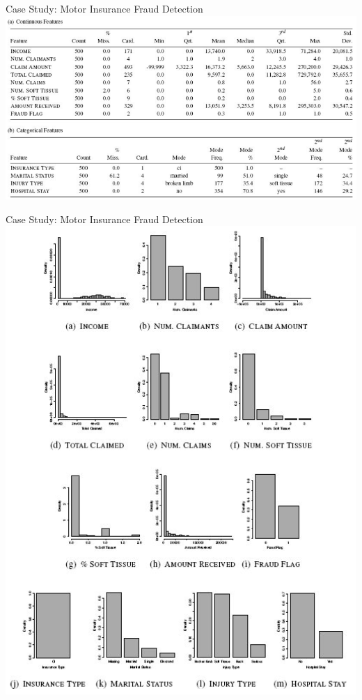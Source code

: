 \documentclass[aspectratio=169,xcolor=dvipsnames]{beamer}
\begin{document}
\begin{frame}{Case Study: Motor Insurance Fraud Detection}
\centering
\includegraphics[scale=0.32]{images/motor_rep.png}
\end{frame}
\begin{frame}{Case Study: Motor Insurance Fraud Detection}
\centering
\includegraphics[scale=0.32]{images/motor_fig.png}
\end{frame}
\end{document}
